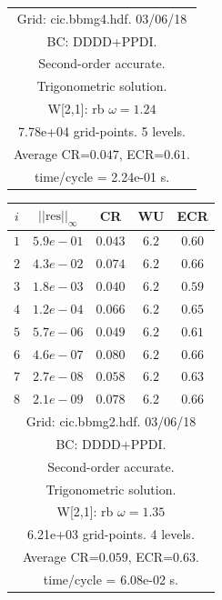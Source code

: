 \begin{table}[hbt]
\begin{center}
{\begin{tabular}{|c|c|c|c|c|}
\hline 
\multicolumn{5}{|c|}{Grid: cic.bbmg4.hdf. 03/06/18}  \\
\multicolumn{5}{|c|}{BC: DDDD+PPDI.}  \\
\multicolumn{5}{|c|}{Second-order accurate.}  \\
\multicolumn{5}{|c|}{Trigonometric solution.}  \\
\multicolumn{5}{|c|}{W[2,1]: rb $\omega=1.24$}  \\
\multicolumn{5}{|c|}{7.78e+04 grid-points. 5 levels.}  \\
\multicolumn{5}{|c|}{Average CR=$0.047$, ECR=$0.61$.}  \\
\multicolumn{5}{|c|}{time/cycle = 2.24e-01 s.}  \\
\hline 
\end{tabular}
\begin{tabular}{|c|c|c|c|c|} \hline 
 $i$   & $\vert\vert\mbox{res}\vert\vert_\infty$  &  CR     &  WU    & ECR  \\   \hline 
 $ 1$  & $ 5.9e-01$ & $0.043$ & $ 6.2$ & $0.60$ \\ 
 $ 2$  & $ 4.3e-02$ & $0.074$ & $ 6.2$ & $0.66$ \\ 
 $ 3$  & $ 1.8e-03$ & $0.040$ & $ 6.2$ & $0.59$ \\ 
 $ 4$  & $ 1.2e-04$ & $0.066$ & $ 6.2$ & $0.65$ \\ 
 $ 5$  & $ 5.7e-06$ & $0.049$ & $ 6.2$ & $0.61$ \\ 
 $ 6$  & $ 4.6e-07$ & $0.080$ & $ 6.2$ & $0.66$ \\ 
 $ 7$  & $ 2.7e-08$ & $0.058$ & $ 6.2$ & $0.63$ \\ 
 $ 8$  & $ 2.1e-09$ & $0.078$ & $ 6.2$ & $0.66$ \\ 
\hline 
\multicolumn{5}{|c|}{Grid: cic.bbmg2.hdf. 03/06/18}  \\
\multicolumn{5}{|c|}{BC: DDDD+PPDI.}  \\
\multicolumn{5}{|c|}{Second-order accurate.}  \\
\multicolumn{5}{|c|}{Trigonometric solution.}  \\
\multicolumn{5}{|c|}{W[2,1]: rb $\omega=1.35$}  \\
\multicolumn{5}{|c|}{6.21e+03 grid-points. 4 levels.}  \\
\multicolumn{5}{|c|}{Average CR=$0.059$, ECR=$0.63$.}  \\
\multicolumn{5}{|c|}{time/cycle = 6.08e-02 s.}  \\
\hline 
\end{tabular}
\begin{tabular}{|c|c|c|c|c|} \hline 

\end{tabular}}
\end{center}
\end{table}
